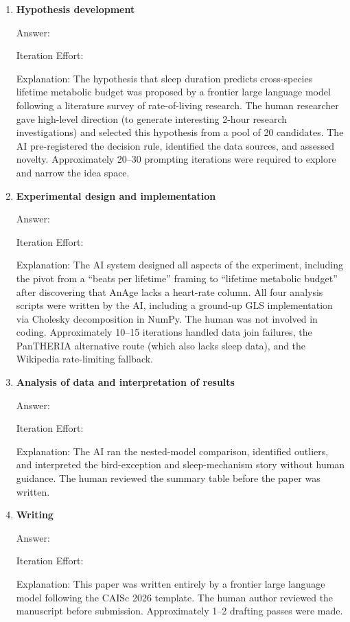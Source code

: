 \documentclass{article}
\begin{document}
\begin{enumerate}

  \item \textbf{Hypothesis development}

    Answer: \involvementD{}

    Iteration Effort: \iterationMedium{}

    Explanation: The hypothesis that sleep duration predicts cross-species lifetime
    metabolic budget was proposed by a frontier large language model following a
    literature survey of rate-of-living research. The human researcher gave high-level
    direction (to generate interesting 2-hour research investigations) and selected this
    hypothesis from a pool of 20 candidates. The AI pre-registered the decision rule,
    identified the data sources, and assessed novelty. Approximately 20--30 prompting
    iterations were required to explore and narrow the idea space.

  \item \textbf{Experimental design and implementation}

    Answer: \involvementD{}

    Iteration Effort: \iterationMedium{}

    Explanation: The AI system designed all aspects of the experiment, including the
    pivot from a ``beats per lifetime'' framing to ``lifetime metabolic budget'' after
    discovering that AnAge lacks a heart-rate column. All four analysis scripts were
    written by the AI, including a ground-up GLS implementation via Cholesky
    decomposition in NumPy. The human was not involved in coding. Approximately 10--15
    iterations handled data join failures, the PanTHERIA alternative route (which also
    lacks sleep data), and the Wikipedia rate-limiting fallback.

  \item \textbf{Analysis of data and interpretation of results}

    Answer: \involvementD{}

    Iteration Effort: \iterationLow{}

    Explanation: The AI ran the nested-model comparison, identified outliers, and
    interpreted the bird-exception and sleep-mechanism story without human guidance.
    The human reviewed the summary table before the paper was written.

  \item \textbf{Writing}

    Answer: \involvementD{}

    Iteration Effort: \iterationLow{}

    Explanation: This paper was written entirely by a frontier large language model
    following the CAISc 2026 template. The human author reviewed the manuscript before
    submission. Approximately 1--2 drafting passes were made.

\end{enumerate}
\end{document}
